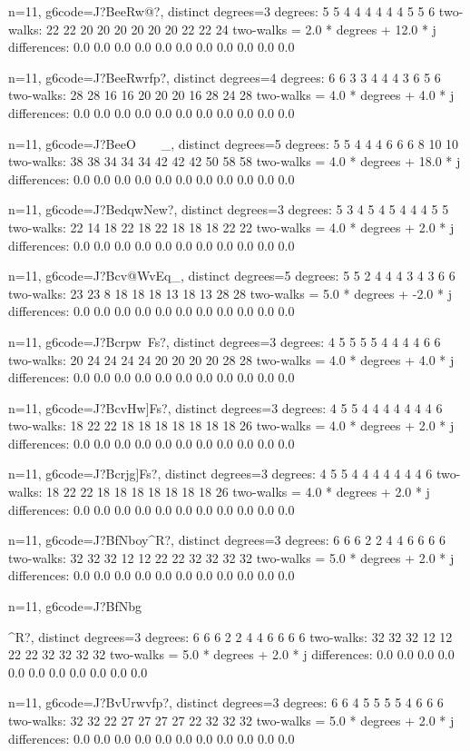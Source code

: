 {{{{{{{{{{n=11, g6code=J?BeeRw}@}?, distinct degrees=3
degrees: 5 5 4 4 4 4 4 4 5 5 6 
two-walks: 22 22 20 20 20 20 20 20 22 22 24 
two-walks = 2.0 * degrees + 12.0 * j
differences: 0.0 0.0 0.0 0.0 0.0 0.0 0.0 0.0 0.0 0.0 0.0 

n=11, g6code=J?BeeRwrfp?, distinct degrees=4
degrees: 6 6 3 3 4 4 4 3 6 5 6 
two-walks: 28 28 16 16 20 20 20 16 28 24 28 
two-walks = 4.0 * degrees + 4.0 * j
differences: 0.0 0.0 0.0 0.0 0.0 0.0 0.0 0.0 0.0 0.0 0.0 

n=11, g6code=J?BeeO~~~~_, distinct degrees=5
degrees: 5 5 4 4 4 6 6 6 8 10 10 
two-walks: 38 38 34 34 34 42 42 42 50 58 58 
two-walks = 4.0 * degrees + 18.0 * j
differences: 0.0 0.0 0.0 0.0 0.0 0.0 0.0 0.0 0.0 0.0 0.0 

n=11, g6code=J?BedqwNew?, distinct degrees=3
degrees: 5 3 4 5 4 5 4 4 4 5 5 
two-walks: 22 14 18 22 18 22 18 18 18 22 22 
two-walks = 4.0 * degrees + 2.0 * j
differences: 0.0 0.0 0.0 0.0 0.0 0.0 0.0 0.0 0.0 0.0 0.0 

n=11, g6code=J?Bcv@WvEq_, distinct degrees=5
degrees: 5 5 2 4 4 4 3 4 3 6 6 
two-walks: 23 23 8 18 18 18 13 18 13 28 28 
two-walks = 5.0 * degrees + -2.0 * j
differences: 0.0 0.0 0.0 0.0 0.0 0.0 0.0 0.0 0.0 0.0 0.0 

n=11, g6code=J?Bcrpw~Fs?, distinct degrees=3
degrees: 4 5 5 5 5 4 4 4 4 6 6 
two-walks: 20 24 24 24 24 20 20 20 20 28 28 
two-walks = 4.0 * degrees + 4.0 * j
differences: 0.0 0.0 0.0 0.0 0.0 0.0 0.0 0.0 0.0 0.0 0.0 

n=11, g6code=J?BcvHw]Fs?, distinct degrees=3
degrees: 4 5 5 4 4 4 4 4 4 4 6 
two-walks: 18 22 22 18 18 18 18 18 18 18 26 
two-walks = 4.0 * degrees + 2.0 * j
differences: 0.0 0.0 0.0 0.0 0.0 0.0 0.0 0.0 0.0 0.0 0.0 

n=11, g6code=J?Bcrjg]Fs?, distinct degrees=3
degrees: 4 5 5 4 4 4 4 4 4 4 6 
two-walks: 18 22 22 18 18 18 18 18 18 18 26 
two-walks = 4.0 * degrees + 2.0 * j
differences: 0.0 0.0 0.0 0.0 0.0 0.0 0.0 0.0 0.0 0.0 0.0 

n=11, g6code=J?BfNboy^R?, distinct degrees=3
degrees: 6 6 6 2 2 4 4 6 6 6 6 
two-walks: 32 32 32 12 12 22 22 32 32 32 32 
two-walks = 5.0 * degrees + 2.0 * j
differences: 0.0 0.0 0.0 0.0 0.0 0.0 0.0 0.0 0.0 0.0 0.0 

n=11, g6code=J?BfNbg{^R?, distinct degrees=3
degrees: 6 6 6 2 2 4 4 6 6 6 6 
two-walks: 32 32 32 12 12 22 22 32 32 32 32 
two-walks = 5.0 * degrees + 2.0 * j
differences: 0.0 0.0 0.0 0.0 0.0 0.0 0.0 0.0 0.0 0.0 0.0 

n=11, g6code=J?BvUrwvfp?, distinct degrees=3
degrees: 6 6 4 5 5 5 5 4 6 6 6 
two-walks: 32 32 22 27 27 27 27 22 32 32 32 
two-walks = 5.0 * degrees + 2.0 * j
differences: 0.0 0.0 0.0 0.0 0.0 0.0 0.0 0.0 0.0 0.0 0.0 

}}}}}}}}}
